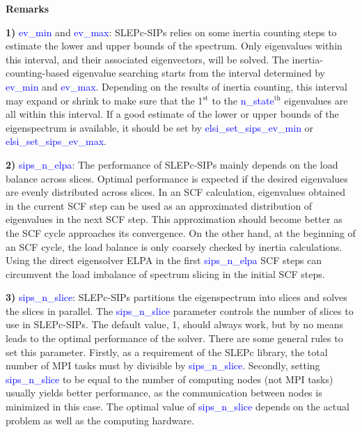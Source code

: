 \documentclass{report}
\begin{document}
\textbf{Remarks}

\textbf{1)} \textcolor{blue}{ev\_min} and \textcolor{blue}{ev\_max}: SLEPc-SIPs relies on some inertia counting steps to estimate the lower and upper bounds of the spectrum. Only eigenvalues within this interval, and their associated eigenvectors, will be solved. The inertia-counting-based eigenvalue searching starts from the interval determined by \textcolor{blue}{ev\_min} and \textcolor{blue}{ev\_max}. Depending on the results of inertia counting, this interval may expand or shrink to make sure that the 1$^\text{st}$ to the \textcolor{blue}{n\_state}$^\text{th}$ eigenvalues are all within this interval. If a good estimate of the lower or upper bounds of the eigenspectrum is available, it should be set by \textcolor{blue}{elsi\_set\_sips\_ev\_min} or \textcolor{blue}{elsi\_set\_sips\_ev\_max}.

\textbf{2)} \textcolor{blue}{sips\_n\_elpa}: The performance of SLEPc-SIPs mainly depends on the load balance across slices. Optimal performance is expected if the desired eigenvalues are evenly distributed across slices. In an SCF calculation, eigenvalues obtained in the current SCF step can be used as an approximated distribution of eigenvalues in the next SCF step. This approximation should become better as the SCF cycle approaches its convergence. On the other hand, at the beginning of an SCF cycle, the load balance is only coarsely checked by inertia calculations. Using the direct eigensolver ELPA in the first \textcolor{blue}{sips\_n\_elpa} SCF steps can circumvent the load imbalance of spectrum slicing in the initial SCF steps.

\textbf{3)} \textcolor{blue}{sips\_n\_slice}: SLEPc-SIPs partitions the eigenspectrum into slices and solves the slices in parallel. The \textcolor{blue}{sips\_n\_slice} parameter controls the number of slices to use in SLEPc-SIPs. The default value, 1, should always work, but by no means leads to the optimal performance of the solver. There are some general rules to set this parameter. Firstly, as a requirement of the SLEPc library, the total number of MPI tasks must by divisible by \textcolor{blue}{sips\_n\_slice}. Secondly, setting \textcolor{blue}{sips\_n\_slice} to be equal to the number of computing nodes (not MPI tasks) usually yields better performance, as the communication between nodes is minimized in this case. The optimal value of \textcolor{blue}{sips\_n\_slice} depends on the actual problem as well as the computing hardware.
\end{document}
